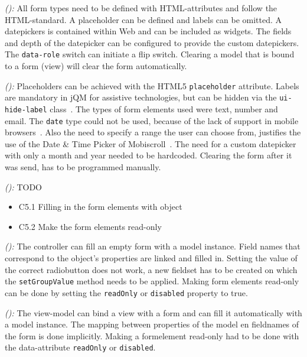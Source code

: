 \documentclass[a4paper]{artikel3}
\newcommand{\code}[1]{\texttt{#1}}
\newcommand{\setspace}[0]{\vspace{2mm}}
\renewcommand{\paragraph}[1]{\setspace \noindent {\bf #1}  }
\newcommand{\framework}[2]{ \emph{#1 (\textbf{#2}): }} %
\newcommand{\challenge}[1]{\paragraph{#1}}
\begin{document}
\framework{\kendoa{}}{}
All form types need to be defined with HTML-attributes and follow the HTML-standard.
A placeholder can be defined and labels can be omitted.
A datepickers is contained within \kendo{} Web and can be included as widgets.
The fields and depth of the datepicker can be configured to provide the custom datepickers.
The \code{data-role} switch can initiate a flip switch.
Clearing a model that is bound to a form (view) will clear the form automatically.


\framework{\jqma{}}{}
Placeholders can be achieved with the HTML5 \code{placeholder} attribute.
Labels are mandatory in jQM for assistive technologies, but can be hidden via the \code{ui-hide-label} class~\cite{JQuery2013}. 
The types of form elements used were text, number and email.
The \code{date} type could not be used, because of the lack of support in mobile browsers~\cite{Deveria2013b}.
Also the need to specify a range the user can choose from, justifies the use of the Date \& Time Picker of Mobiscroll~\cite{Mobiscroll2013}.
The need for a custom datepicker with only a month and year needed to be hardcoded.
Clearing the form after it was send, has to be programmed manually.

\framework{\lungoa{}}{}
TODO


\challenge{\chal{vullen}}
\begin{itemize}
  \item C5.1 Filling in the form elements with object
  \item C5.2 Make the form elements read-only
\end{itemize}

\framework{\sta{}}{}
The controller can fill an empty form with a model instance.
Field names that correspond to the object's properties are linked and filled in.
Setting the value of the correct radiobutton does not work,  a new fieldset has to be created on which the \code{setGroupValue} method needs to be applied.  
Making form elements read-only can be done by setting the \code{readOnly} or \code{disabled} property to true.

\framework{\kendoa{}}{}
The view-model can bind a view with a form and can fill it automatically with a model instance.
The mapping between properties of the model en fieldnames of the form is done implicitly.
Making a formelement read-only had to be done with the data-attribute \code{readOnly} or \code{disabled}.
\end{document}
